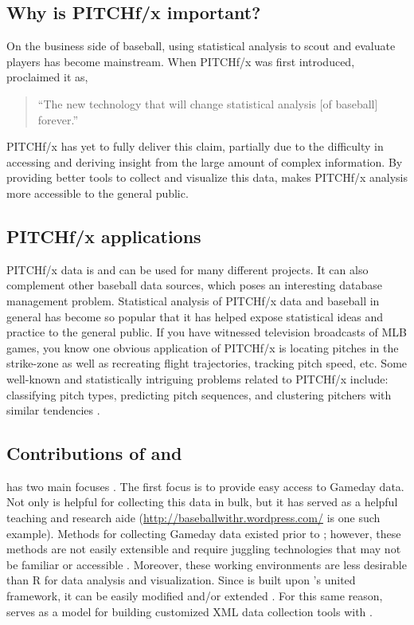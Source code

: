 \begin{article}
\subsection{Why is PITCHf/x important?}

On the business side of baseball, using statistical analysis to scout
and evaluate players has become mainstream. When PITCHf/x was first
introduced, \citep{slate} proclaimed it as, \begin{quote} ``The new technology that will change statistical analysis [of baseball] forever.'' \end{quote}
PITCHf/x has yet to fully deliver this claim, partially due to the
difficulty in accessing and deriving insight from the large amount
of complex information. By providing better tools to collect and visualize
this data,  makes PITCHf/x analysis more accessible
to the general public.


\subsection{PITCHf/x applications}

PITCHf/x data is and can be used for many different projects. It can
also complement other baseball data sources, which poses an interesting
database management problem. Statistical analysis of PITCHf/x data
and baseball in general has become so popular that it has helped expose
statistical ideas and practice to the general public. If you have
witnessed television broadcasts of MLB games, you know one obvious
application of PITCHf/x is locating pitches in the strike-zone as
well as recreating flight trajectories, tracking pitch speed, etc.
Some well-known and statistically intriguing problems related to PITCHf/x
include: classifying pitch types, predicting pitch sequences, and
clustering pitchers with similar tendencies \citep{curve}.


\subsection[Contributions of pitchRx and XML2R]{Contributions of  and }

 has two main focuses \citep{pitchRx}. The first focus
is to provide easy access to Gameday data. Not only is 
helpful for collecting this data in bulk, but it has served as a helpful
teaching and research aide (\url{http://baseballwithr.wordpress.com/}
is one such example). Methods for collecting Gameday data existed
prior to ; however, these methods are not easily extensible
and require juggling technologies that may not be familiar or accessible
\citep{database}. Moreover, these working environments are less desirable
than R for data analysis and visualization. Since  is
built upon 's united framework, it can be easily modified
and/or extended \citep{XML2R}. For this same reason, 
serves as a model for building customized XML data collection tools
with .


\end{article}

